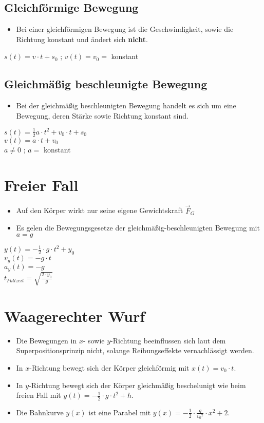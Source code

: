 \documentclass{article}
\begin{document}
\subsection*{Gleichförmige Bewegung}
\begin{itemize}
	\item Bei einer gleichförmigen Bewegung ist die Geschwindigkeit, sowie die Richtung konstant und ändert sich \textbf{nicht}.
\end{itemize}
\begin{center}
	$s(t) = v \cdot t + s_0$ ; $v(t) = v_0 =$ konstant
\end{center}
\subsection*{Gleichmäßig beschleunigte Bewegung}
\begin{itemize}
	\item Bei der gleichmäßig beschleunigten Bewegung handelt es sich um eine Bewegung, deren Stärke sowie Richtung konstant sind.
\end{itemize}
\begin{center}
	$s(t) = \frac{1}{2}a \cdot t^2 + v_0 \cdot t + s_0$\\
	$v(t) = a \cdot t + v_0$\\
	$a \neq 0$ ; $a =$ konstant
\end{center}
\section*{Freier Fall}
\begin{itemize}
	\item Auf den Körper wirkt nur seine eigene Gewichtskraft $\vec{F}_G$
	\item Es gelen die Bewegungsgesetze der gleichmäßig-beschleunigten Bewegung mit $a=g$
\end{itemize}
\begin{center}
	$y(t) = -\frac{1}{2} \cdot g \cdot t^2 + y_0$\\
	$v_y(t) = -g \cdot t$\\
	$a_y(t) = -g$\\
	$t_{Fallzeit} = \sqrt{\frac{2 \cdot y_0}{g}}$
\end{center}
\section*{Waagerechter Wurf}
\begin{itemize}
	\item Die Bewegungen in $x$- sowie $y$-Richtung beeinflussen sich laut dem Superpositionsprinzip nicht, solange Reibungseffekte vernachlässigt werden.
	\item In $x$-Richtung bewegt sich der Körper gleichförmig mit $x(t) = v_0 \cdot t$.
	\item In $y$-Richtung bewegt sich der Körper gleichmäßig beschelunigt wie beim freien Fall mit $y(t) = -\frac{1}{2} \cdot g \cdot t^2 + h$.
	\item Die Bahnkurve $y(x)$ ist eine Parabel mit $y(x) = -\frac{1}{2} \cdot \frac{g}{{v_{0}}^2} \cdot x^2 + 2$.
\end{itemize}
\end{document}
